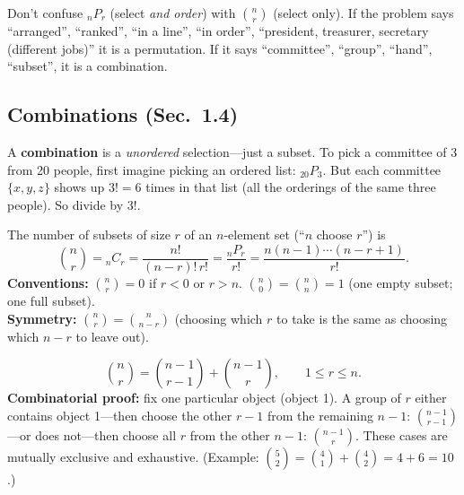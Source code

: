 \documentclass[11pt]{article}
\let\oldsubsection\subsection
\renewcommand{\subsection}{\Needspace{14\baselineskip}\oldsubsection}
\begin{document}
\begin{warnbox}
Don't confuse ${}_nP_r$ (select \emph{and order}) with $\binom nr$ (select only). If the problem says ``arranged'', ``ranked'', ``in a line'', ``in order'', ``president, treasurer, secretary (different jobs)'' it is a permutation. If it says ``committee'', ``group'', ``hand'', ``subset'', it is a combination.
\end{warnbox}

\subsection{Combinations (Sec.\ 1.4)}

\begin{ideabox}
A \textbf{combination} is a \emph{unordered} selection---just a subset. To pick a committee of 3 from 20 people, first imagine picking an ordered list: ${}_{20}P_3$. But each committee $\{x,y,z\}$ shows up $3!=6$ times in that list (all the orderings of the same three people). So divide by $3!$.
\end{ideabox}

\begin{defbox}
The number of subsets of size $r$ of an $n$-element set (``$n$ choose $r$'') is
\[ \binom nr={}_nC_r=\frac{n!}{(n-r)!\,r!}=\frac{{}_nP_r}{r!}=\frac{n(n-1)\cdots(n-r+1)}{r!}. \]
\textbf{Conventions:} $\binom nr=0$ if $r<0$ or $r>n$. $\binom n0=\binom nn=1$ (one empty subset; one full subset).\\
\textbf{Symmetry:} $\binom nr=\binom n{n-r}$ (choosing which $r$ to take is the same as choosing which $n-r$ to leave out).
\end{defbox}

\begin{thmbox}
\[ \binom nr=\binom{n-1}{r-1}+\binom{n-1}{r},\qquad 1\le r\le n. \]
\textbf{Combinatorial proof:} fix one particular object (object 1). A group of $r$ either contains object 1---then choose the other $r-1$ from the remaining $n-1$: $\binom{n-1}{r-1}$---or does not---then choose all $r$ from the other $n-1$: $\binom{n-1}{r}$. These cases are mutually exclusive and exhaustive. (Example: $\binom52=\binom41+\binom42=4+6=10$.)
\end{thmbox}
\end{document}
